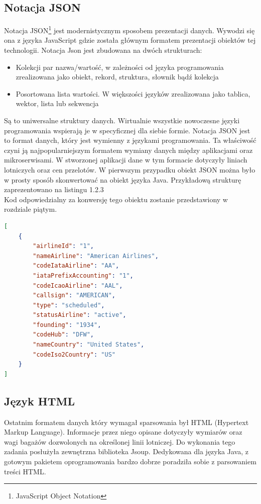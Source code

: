 \documentclass[12pt, twoside]{report}
\begin{document}
\subsection{Notacja JSON}
Notacja JSON\footnote{JavaScript Object Notation} jest modernistycznym sposobem prezentacji danych. Wywodzi się ona z języka JavaScript gdzie została głównym formatem prezentacji obiektów tej technologii. Notacja Json jest zbudowana na dwóch strukturach\cite{json}:
\begin{itemize}[noitemsep,topsep=0pt]
\item Kolekcji par nazwa/wartość, w zależności od języka programowania zrealizowana jako obiekt, rekord, struktura, słownik bądź kolekcja
\item Posortowana lista wartości. W większości języków zrealizowana jako tablica, wektor, lista lub sekwencja
\end{itemize}
Są to uniwersalne struktury danych. Wirtualnie wszystkie nowoczesne języki programowania wspierają je w specyficznej dla siebie formie. Notacja JSON jest to format danych, który jest wymienny z językami programowania. Ta właściwość czyni ją najpopularniejszym formatem wymiany danych między aplikacjami oraz mikroserwisami. W stworzonej aplikacji dane w tym formacie dotyczyły liniach lotniczych oraz cen przelotów. W pierwszym przypadku obiekt JSON można było w prosty sposób skonwertować na obiekt języka Java. Przykładową strukturę zaprezentowano na listingu 1.2.3\\
Kod odpowiedzialny za konwersję tego obiektu zostanie przedstawiony w rozdziale piątym.
\newpage
\begin{lstlisting}[language=JSON, caption= Przykładowy obiekt w notacji JSON]
   [
    {
        "airlineId": "1",
        "nameAirline": "American Airlines",
        "codeIataAirline": "AA",
        "iataPrefixAccounting": "1",
        "codeIcaoAirline": "AAL",
        "callsign": "AMERICAN",
        "type": "scheduled",
        "statusAirline": "active",
        "founding": "1934",
        "codeHub": "DFW",
        "nameCountry": "United States",
        "codeIso2Country": "US"
    }
]
\end{lstlisting}
\subsection{Język HTML}


Ostatnim formatem danych który wymagał sparsowania był HTML (Hypertext Markup Language). Informacje przez niego opisane dotyczyły wymiarów oraz wagi bagażów dozwolonych na określonej linii lotniczej. Do wykonania tego zadania posłużyła zewnętrzna biblioteka Jsoup. Dedykowana dla języka Java, z gotowym pakietem oprogramowania bardzo dobrze poradziła sobie z parsowaniem treści HTML.
\newpage
\end{document}
